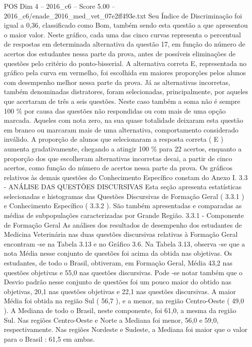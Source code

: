 \begin{textsample}{POS Dim 4 – 2016\_c6 – Score 5.00 – 2016\_c6/enade\_2016\_med\_vet\_07e2ff493e.txt}
Seu Índice de Discriminação foi igual a 0,36, classificado como Bom, também sendo esta questão a que apresentou o maior valor.
Neste gráfico, cada uma das cinco curvas representa o percentual de respostas em determinada alternativa da questão 17, em função do número de acertos dos estudantes nessa parte da prova, antes de possíveis eliminações de questões pelo critério do ponto-bisserial.
A alternativa correta E, representada no gráfico pela curva em vermelho, foi escolhida em maiores proporções pelos alunos com desempenho melhor nessa parte da prova.
Já as alternativas incorretas, também denominadas distratores, foram selecionadas, principalmente, por aqueles que acertaram de três a seis questões.
Neste caso também a soma não é sempre 100 \% por causa das questões não respondidas ou com mais de uma opção marcada.
Aqueles com nota zero, na sua quase totalidade deixaram esta questão em branco ou marcaram mais de uma alternativa, comportamento considerado inválido.
A proporção de alunos que selecionaram a resposta correta ( E ) aumenta gradativamente, chegando a atingir 100 \% para 22 acertos, enquanto a proporção dos que escolheram alternativas incorretas decai, a partir de cinco acertos, como função do número de acertos nessa parte da prova.
Os gráficos relativos às demais questões do Conhecimento Específico constam do Anexo I. 3.3 - ANÁLISE DAS QUESTÕES DISCURSIVAS Esta seção apresenta estatísticas selecionadas e histogramas das Questões Discursivas de Formação Geral ( 3.3.1 ) e Conhecimento Específico ( 3.3.2 ).
São também apresentadas e comparadas as médias de subpopulações caracterizadas por Grande Região. 3.3.1 - Componente de Formação Geral As análises dos resultados de desempenho dos estudantes de Medicina Veterinária nas duas questões discursivas relativas à Formação Geral encontram -se na Tabela 3.13 e no Gráfico 3.6.
Na Tabela 3.13, observa -se que a nota Média nesse conjunto de questões foi acima da obtida nas objetivas.
Os estudantes, de todo o Brasil, obtiveram, em Formação Geral, Média 43,2 nas questões objetivas e 55,0 nas questões discursivas.
Pode -se notar também que o Desvio padrão nesse conjunto de questões foi um pouco maior do obtido nas objetivas, 20,1 nas questões objetivas e 22,1 nas questões discursivas.
A maior Média foi obtida na região Sul ( 56,7 ), e a menor, na região Centro-Oeste ( 49,0 ).
A Mediana de todo o Brasil, neste componente, foi 61,0, a mesma da região Sul.
Nas regiões Centro-Oeste e Norte a Mediana foi menor, 56,0 e 59,0, respectivamente.
Nas regiões Nordeste e Sudeste, a Mediana foi maior que o valor para o Brasil : 61,5 em ambas.

\end{textsample}
